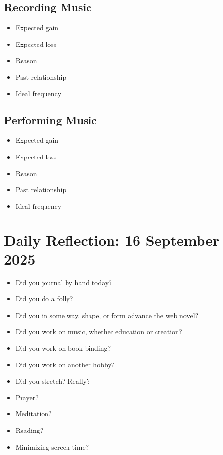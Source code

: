 \documentclass[12pt]{article}
\renewcommand{\,}{\textsuperscript{,}}
\begin{document}
\subsection{Recording Music}
\begin{itemize}
    \item Expected gain
    \item Expected loss
    \item Reason
    \item Past relationship
    \item Ideal frequency

\end{itemize}
\subsection{Performing Music}
\begin{itemize}
    \item Expected gain
    \item Expected loss
    \item Reason
    \item Past relationship
    \item Ideal frequency

\end{itemize}
\section{Daily Reflection: 16 September 2025}

\begin{itemize}

\item Did you journal by hand today?

\item Did you do a folly?

\item Did you in some way, shape, or form advance the web novel?

\item Did you work on music, whether education or creation?

\item Did you work on book binding?

\item Did you work on another hobby?

\item Did you stretch? Really?

\item Prayer?

\item Meditation?

\item Reading?

\item Minimizing screen time?

\end{itemize}
\end{document}
